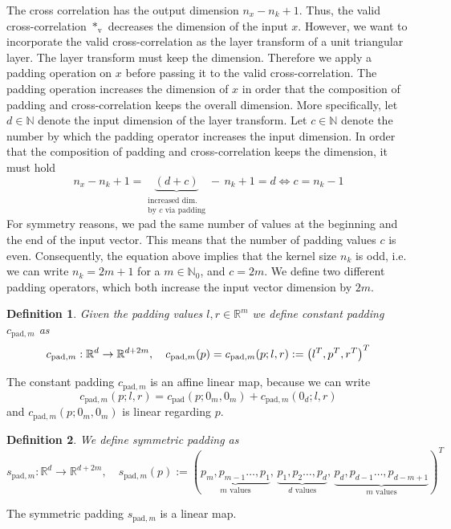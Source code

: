 \documentclass[twoside,a4paper]{article}
\newtheorem{definition}{Definition}
\begin{document}
The cross correlation has the output dimension $n_x - n_k + 1$.
Thus, the valid cross-correlation $*_{\text{v}}$ decreases the dimension of the input $x$.
However, we want to incorporate the valid cross-correlation as the layer transform of a
unit triangular layer. The layer transform must keep the dimension.
Therefore we apply a padding operation on $x$ before passing it to the valid
cross-correlation. The padding operation increases the dimension of $x$ in order
that the composition of padding and cross-correlation keeps the overall dimension.
More specifically, let $d \in \mathbb{N}$ denote the input dimension of the layer transform.
Let $c \in \mathbb{N}$ denote the number by which the padding operator increases 
the input dimension. In order that the composition of padding and cross-correlation
keeps the dimension, it must hold
\begin{equation*}
	n_x - n_k + 1 = \underbrace{(d+c)}_{\substack{
		\text{increased dim.} \\
		\text{by } c \text{ via padding}
	}} - \, n_k + 1 = d \iff c = n_k-1
\end{equation*}
For symmetry reasons, we pad the same number of values at the beginning and 
the end of the input vector. This means that the number of padding values $c$ is even. 
Consequently, the equation above implies that the kernel size $n_k$ is odd, i.e. we can write
$n_k = 2m+1$ for a $m \in \mathbb{N}_0$, and $c=2m$. We define two different padding operators,
which both increase the input vector dimension by $2m$.

\begin{definition}
	Given the padding values $l,r \in \mathbb{R}^m$ we define constant padding 
	$c_{\text{pad},m}$ as
	\begin{equation*}
		c_{\text{pad},m} : \mathbb{R}^d \to \mathbb{R}^{d+2m},
		\quad c_{\text{pad},m}(p) = c_{\text{pad},m}(p;l,r) := \left( l^T, p^T, r^T \right)^T
	\end{equation*}
\end{definition}
The constant padding $c_{\text{pad},m}$ is an affine linear map, because we can write
\begin{equation}\label{cpad_affine}
	c_{\text{pad},m}(p;l,r) = c_{\text{pad}}(p;0_m,0_m)
	+ c_{\text{pad},m}(0_d;l,r)
\end{equation}
and $c_{\text{pad},m}(p;0_m,0_m)$ is linear regarding $p$.

\begin{definition}
	We define symmetric padding as
	\begin{equation*}
		s_{\text{pad},m} : \mathbb{R}^d \to \mathbb{R}^{d+2m},
		\quad s_{\text{pad},m}(p) := (
			\underbrace{p_m, p_{m-1} \dots, p_1}_{m \text{ values}}, \,
			\underbrace{p_1, p_2 \dots, p_d}_{d \text{ values}}, \,
			\underbrace{p_d, p_{d-1} \dots, p_{d-m+1}}_{m \text{ values}}
		)^T
	\end{equation*}
\end{definition}
The symmetric padding $s_{\text{pad},m}$ is a linear map.
\end{document}
